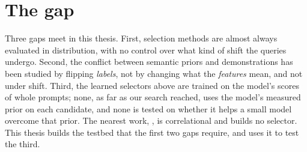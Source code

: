 \section{The gap}
\label{sec:bg-gap}

Three gaps meet in this thesis.
First, selection methods are almost always evaluated in distribution, with no control over what kind of shift the queries undergo.
Second, the conflict between semantic priors and demonstrations has been studied by flipping \emph{labels}, not by changing what the \emph{features} mean, and not under shift. Third, the learned selectors above are trained on the model's scores of whole prompts; none, as far as our search reached, uses the model's measured prior on each candidate, and none is tested on whether it helps a small model overcome that prior. The nearest work, \citet{kato2025affinity}, is correlational and builds no selector. This thesis builds the testbed that the first two gaps require, and uses it to test the third.
